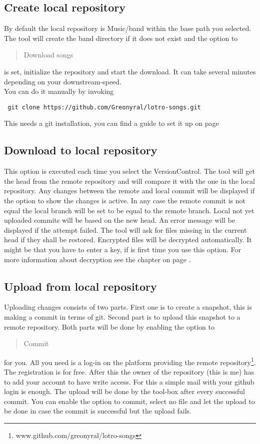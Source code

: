 \documentclass[10pt,a4paper,oneside]{article}
\begin{document}
\subsection{Create local repository}
By default the local repository is Music/band within the base path you selected. The tool will create the band directory if it does not exist and the option to \begin{quote}Download songs\end{quote} is set, initialize the repository and start the download. It can take several  minutes depending on your downstream-speed. \\
You can do it manually by invoking
\begin{verbatim} git clone https://github.com/Greonyral/lotro-songs.git \end{verbatim} 
This needs a git installation, you can find a guide to set it up on page \pageref{gitInstal}

\subsection{Download to local repository}
This option is executed each time you select the VersionControl. The tool will get the head from the remote repository and will compare it with the one in the local repository. Any changes between the remote and local commit will be displayed if the option to show the changes is active. In any case the remote commit is not equal the local branch will be set to be equal to the remote branch. Local not yet uploaded commits will be based on the new head. An error message will be displayed if the attempt failed. The tool will ask for files missing in the current head if they shall be restored. Encrypted files will be decrypted automatically. It might be that you have to enter a key, if is first time you use this option. For more information about decryption see the chapter on page \pageref{AES}.

\subsection{Upload from local repository}
Uploading changes consists of two parts. First one is to create a snapshot, this is making a commit in terms of git. Second part is to upload this snapshot to a remote repository. Both parts will be done by enabling the option to \begin{quote} Commit \end{quote} for you. All you need is a log-in on the platform providing the remote repository\footnote{www.github.com/greonyral/lotro-songs}. The registration is for free. After this the owner of the repository (this is me) has to add your account to have write access. For this a simple mail with your github login is enough. The upload will be done by the tool-box after every successful commit. You can enable the option to commit, select no file and let the upload to be done in case the commit is successful but the upload fails.
\end{document}
